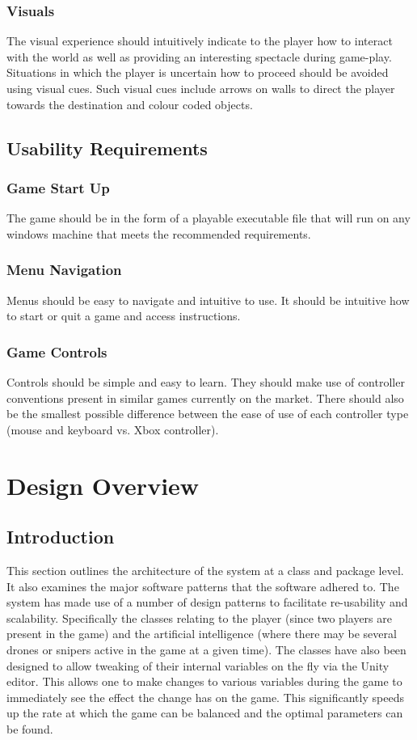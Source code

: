 \documentclass[11pt,a4paper]{article}
\begin{document}
\subsubsection{Visuals}
The visual experience should intuitively indicate to the player how to interact with the world as well as providing an interesting spectacle during game-play. Situations in which the player is uncertain how to proceed should be avoided using visual cues. Such visual cues include arrows on walls to direct the player towards the destination and colour coded objects.
\subsection{Usability Requirements}
\subsubsection{Game Start Up}
The game should be in the form of a playable executable file that will run on any windows machine that meets the recommended requirements.
\subsubsection{Menu Navigation}
Menus should be easy to navigate and intuitive to use. It should be intuitive how to start or quit a game and access instructions.
\subsubsection{Game Controls}
Controls should be simple and easy to learn. They should make use of controller conventions present in similar games currently on the market. There should also be the smallest possible difference between the ease of use of each controller type (mouse and keyboard vs. Xbox controller).
\section{Design Overview}
\label{s:design-overview}
\subsection{Introduction}
This section outlines the architecture of the system at a class and package level. It also examines the major software patterns that the software adhered to. The system has made use of a number of design patterns to facilitate re-usability and scalability. Specifically the classes relating to the player (since two players are present in the game) and the artificial intelligence (where there may be several drones or snipers active in the game at a given time). The classes have also been designed to allow tweaking of their internal variables on the fly via the Unity editor. This allows one to make changes to various variables during the game to immediately see the effect the change has on the game. This significantly speeds up the rate at which the game can be balanced and the optimal parameters can be found.
\end{document}
